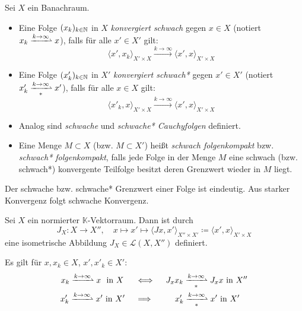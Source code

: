 \documentclass{cheat-sheet}
\newcommand{\K}{\mathbb{K}}
\newcommand{\LSO}{\mathcal{L}} %
\newcommand{\convWith}[1]{\xrightarrow{#1 \to \infty}} %
\newcommand{\convWeaklyWith}[1]{\xrightharpoonup{#1 \to \infty}} %
\newcommand{\convWeaklyStarWith}[1]{\xrightharpoonup[*]{#1 \to \infty}} %
\begin{document}
\begin{definition}
  Sei $X$ ein Banachraum.
  \begin{itemize}
    \item Eine Folge $(x_k)_{k \in \mathbb{N}}$ in $X$ \emph{konvergiert schwach} gegen $x \in X$ (notiert $x_k \convWeaklyWith{k} x$), falls für alle $x' \in X'$ gilt:
    \[ \langle x', x_k \rangle_{X' {\times} X} \convWith{k} \langle x', x \rangle_{X' {\times} X} \]
    \item Eine Folge $(x'_k)_{k \in \mathbb{N}}$ in $X'$ \emph{konvergiert schwach*} gegen $x' \in X'$ (notiert $x'_k \convWeaklyStarWith{k} x'$), falls für alle $x \in X$ gilt:
    \[ \langle x'_k, x \rangle_{X' {\times} X} \convWith{k} \langle x', x \rangle_{X' {\times} X} \]
    \item Analog sind \emph{schwache} und \emph{schwache* Cauchyfolgen} definiert.
    \item Eine Menge $M \subset X$ (bzw. $M \subset X'$) heißt \emph{schwach folgenkompakt} bzw. \emph{schwach* folgenkompakt}, falls jede Folge in der Menge $M$ eine schwach (bzw. schwach*) konvergente Teilfolge besitzt deren Grenzwert wieder in $M$ liegt.
  \end{itemize}
\end{definition}

\begin{bem}
  Der schwache bzw. schwache* Grenzwert einer Folge ist eindeutig. Aus starker Konvergenz folgt schwache Konvergenz.
\end{bem}

\begin{satz}
  Sei $X$ ein normierter $\K$-Vektorraum. Dann ist durch
  \[ J_X : X \to X'', \quad x \mapsto x' \mapsto \langle Jx , x' \rangle_{X'' {\times} X'} \coloneqq \langle x', x \rangle_{X' {\times} X} \]
  eine isometrische Abbildung $J_X \in \LSO(X, X'')$ definiert.
\end{satz}

\begin{satz}
  Es gilt für $x, x_k \in X$, $x', x'_k \in X'$:
  \begin{align*}
    x_k \convWeaklyWith{k} x \,\, \text{ in } X \, \quad &\iff \quad J_x x_k \convWeaklyStarWith{k} J_x x \text{ in } X'' \\
    x'_k \convWeaklyWith{k} x' \text{ in } X' \quad &\implies \qquad \,\, x'_k \convWeaklyStarWith{k} x' \text{ in } X'
  \end{align*}
\end{satz}
\end{document}
